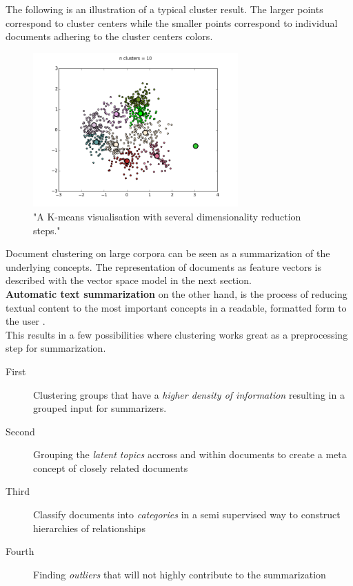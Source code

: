  The following is an illustration of a typical cluster result. The larger points correspond to cluster centers while the smaller points correspond to individual documents adhering to the cluster centers colors. 

  \begin{figure}[h!]
    \centering
      \includegraphics[width=0.7\textwidth]{clustering_intro.png}
      \caption{"A K-means visualisation with several dimensionality reduction steps."}
      \label{clustering_intro}
  \end{figure}

  Document clustering on large corpora can be seen as a summarization of the underlying concepts. The representation of documents as feature vectors is described with the vector space model in the next section.\\
  \textbf{Automatic text summarization} on the other hand, is the process of reducing textual content to the most important concepts in a readable, formatted form to the user \cite{SumEvaluation2001}.\\
  This results in a few possibilities where clustering works great as a preprocessing step for summarization.
  
  \begin{description}
    \item[First] Clustering groups that have a \emph{higher density of information} resulting in a grouped input for summarizers.
    \item[Second] Grouping the \emph{latent topics} accross and within documents to create a meta concept of closely related documents
    \item[Third] Classify documents into \emph{categories} in a semi supervised way to construct hierarchies of relationships
    \item[Fourth] Finding \emph{outliers} that will not highly contribute to the summarization
  \end{description}

